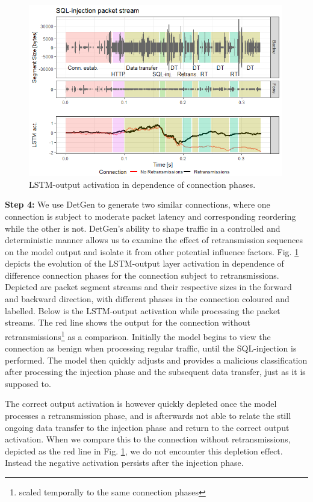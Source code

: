 \documentclass[runningheads]{llncs}
\begin{document}
\begin{figure}
\centering
\includegraphics[width=0.99\textwidth]{images/LSTM_activation_new.png}
\caption{LSTM-output activation in dependence of connection phases.}\label{fig:LSTM_act}
\end{figure}

\textbf{Step 4:} We use DetGen to generate two similar connections, where one connection is subject to moderate packet latency and corresponding reordering while the other is not. DetGen's ability to shape traffic in a controlled and deterministic manner allows us to examine the effect of retransmission sequences on the model output and isolate it from other potential influence factors. 
Fig. \ref{fig:LSTM_act} depicts the evolution of the LSTM-output layer activation in dependence of difference connection phases for the connection subject to retransmissions. Depicted are packet segment streams and their respective sizes in the forward and backward direction, with different phases in the connection coloured and labelled. Below is the LSTM-output activation while processing the packet streams. The red line shows the output for the connection without retransmissions\footnote{scaled temporally to the same connection phases} as a comparison.
Initially the model begins to view the connection as benign when processing regular traffic, until the SQL-injection is performed. The model then quickly adjusts and provides a malicious classification after processing the injection phase and the subsequent data transfer, just as it is supposed to. 

The correct output activation is however quickly depleted once the model processes a retransmission phase, and is afterwards not able to relate the still ongoing data transfer to the injection phase and return to the correct output activation. When we compare this to the connection without retransmissions, depicted as the red line in Fig. \ref{fig:LSTM_act}, we do not encounter this depletion effect. Instead the negative activation persists after the injection phase.
\end{document}
